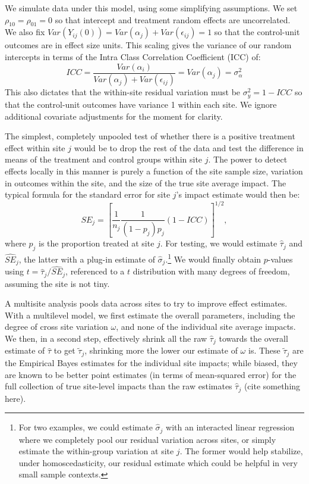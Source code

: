 \documentclass[]{article}
\begin{document}
We simulate data under this model, using some simplifying assumptions.
We set $\rho_{10} = \rho_{01} = 0$ so that intercept and treatment random effects are uncorrelated.
We also fix $Var(Y_{ij}(0)) = Var(\alpha_j) + Var(\epsilon_{ij}) = 1$ so that the control-unit outcomes are in effect size units.
This scaling gives the variance of our random intercepts in terms of the Intra Class Correlation Coefficient (ICC) of:
$$ICC = \frac{Var(\alpha_i)}{Var(\alpha_j) + Var(\epsilon_{ij})} = Var(\alpha_j) = \sigma^2_\alpha$$
This also dictates that the within-site residual variation must be $\sigma^2_y = 1-ICC$ so that the control-unit outcomes have variance 1 within each site.
We ignore additional covariate adjustments for the moment for clarity.

The simplest, completely unpooled test of whether there is a positive treatment effect within site $j$ would be to drop the rest of the data and test the difference in means of the treatment and control groups within site $j$.
The power to detect effects locally in this manner is purely a function of the site sample size, variation in outcomes within the site, and the size of the true site average impact.
The typical formula for the standard error for site $j$'s impact estimate would then be:
$$ SE_j = \left[ \frac{1}{n_j} \frac{1}{(1-p_j)p_j} (1-ICC) \right]^{1/2} , $$ 
where $p_j$ is the proportion treated at site $j$.
For testing, we would estimate $\hat{\tau}_j$ and $\widehat{SE}_j$, the latter with a plug-in estimate of $\hat{\sigma}_j$.\footnote{For two examples, we could estimate $\hat{\sigma}_j$ with an interacted linear regression where we completely pool our residual variation across sites, or simply estimate the within-group variation at site $j$.
The former would help stabilize, under homoscedasticity, our residual estimate which could be helpful in very small sample contexts.}
We would finally obtain $p$-values using $t = \hat{\tau}_j / \widehat{SE}_j$, referenced to a $t$ distribution with many degrees of freedom, assuming the site is not tiny.

A multisite analysis pools data across sites to try to improve effect estimates.
With a multilevel model, we first estimate the overall parameters, including the degree of cross site variation $\omega$, and none of the individual site average impacts.
We then, in a second step, effectively shrink all the raw $\hat{\tau}_j$ towards the overall estimate of $\hat{\tau}$ to get $\tilde{\tau}_j$, shrinking more the lower our estimate of $\omega$ is.
These $\tilde{\tau}_j$ are the Empirical Bayes estimates for the individual site impacts; while biased, they are known to be better point estimates (in terms of mean-squared error) for the full collection of true site-level impacts than the raw estimates $\hat{\tau}_j$ (cite something here).
\end{document}
